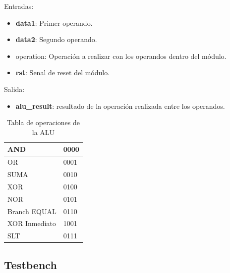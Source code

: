 Entradas:

\begin{itemize}
  \item \textbf{data1}: Primer operando.
  \item \textbf{data2}: Segundo operando.
  \item operation: Operaci\'on a realizar con los operandos dentro del m\'odulo.
  \item \textbf{rst}: Senal de reset del m\'odulo.
\end{itemize}

Salida:

\begin{itemize}
  \item \textbf{alu\_result}: 	resultado de la operaci\'on realizada entre los operandos.
\end{itemize}

\begin{center}
\begin{table}[H]
\scriptsize
\centering
\begin{tabular}[\textwidth]{|l|l|}
\hline
AND & 0000\\
\hline
OR & 0001\\
\hline
SUMA & 0010\\
\hline
XOR & 0100\\
\hline
NOR & 0101\\
\hline
Branch EQUAL & 0110\\
\hline
XOR Inmediato & 1001\\
\hline
SLT & 0111\\
\hline
\end{tabular}
\center
\caption{Tabla de operaciones de la ALU}
\label{tab:test1}
\end{table}
\end{center}

\subsection{Testbench}